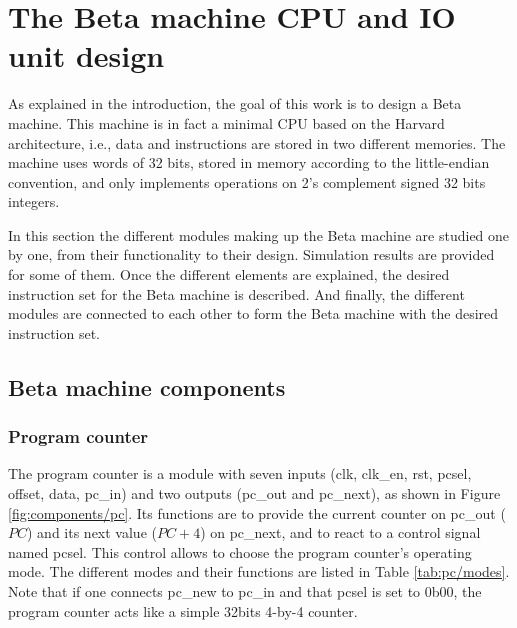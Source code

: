 \chapter{The Beta machine CPU and IO unit design}

As explained in the introduction, the goal of this work is to design a Beta machine. This machine is 
in fact a minimal CPU based on the Harvard architecture, i.e., data and instructions are stored in 
two different memories. The machine uses words of 32 bits, stored in memory according to the little-endian convention, 
and only implements operations on 2's complement signed 32 bits integers. 

In this section the different modules making up the Beta machine are studied one by one, from 
their functionality to their design. Simulation results are provided for some of them. Once the 
different elements are explained, the desired instruction set for the Beta machine is
described. And finally, the different modules are connected to each other to form the Beta
machine with the desired instruction set.

\section{Beta machine components}

\subsection{Program counter}

The program counter is a module with seven inputs (clk, clk\_en, rst, pcsel, offset, data, pc\_in) 
and two outputs (pc\_out and pc\_next), as shown in Figure \ref{fig:components/pc}. 
Its functions are to provide the current counter on pc\_out ($PC$) and its 
next value ($PC + 4$) on pc\_next, and to react to a control signal named pcsel. This control 
allows to choose the program counter's operating mode. The different modes and their functions
are listed in Table \ref{tab:pc/modes}. Note that if one connects pc\_new to pc\_in and that pcsel
is set to 0b00, the program counter acts like a simple 32bits 4-by-4 counter.


